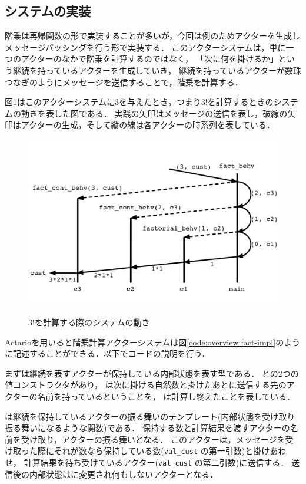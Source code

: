\subsection{システムの実装}

階乗は再帰関数の形で実装することが多いが，今回は例のためアクターを生成しメッセージパッシングを行う形で実装する．
このアクターシステムは，単に一つのアクターのなかで階乗を計算するのではなく，
「次に何を掛けるか」という継続を持っているアクターを生成していき，
継続を持っているアクターが数珠つなぎのようにメッセージを送信することで，階乗を計算する．

図\ref{img:overview:fact}はこのアクターシステムに$3$を与えたとき，つまり$3!$を計算するときのシステムの動きを表した図である．
実践の矢印はメッセージの送信を表し，破線の矢印はアクターの生成，そして縦の線は各アクターの時系列を表している．

\begin{figure}[tp]
  \centering
  \includegraphics[width=15cm]{./img/overview/fact.pdf}
  \label{img:overview:fact}
  \caption{$3!$を計算する際のシステムの動き}
\end{figure}

Actarioを用いると階乗計算アクターシステムは図\ref{code:overview:fact-impl}のように記述することができる．以下でコードの説明を行う．

まずは継続を表すアクターが保持している内部状態を表す型である．
との2つの値コンストラクタがあり，
は次に掛ける自然数と掛けたあとに送信する先のアクターの名前を持っているということを，
は計算し終えたことを表している．

は継続を保持しているアクターの振る舞いのテンプレート(内部状態を受け取り振る舞いになるような関数)である．
保持する数と計算結果を渡すアクターの名前を受け取り，アクターの振る舞いとなる．
このアクターは，メッセージを受け取った際にそれが数なら保持している数(\lstinline{val_cust} の第一引数)と掛けあわせ，
計算結果を待ち受けているアクター(\lstinline{val_cust} の第二引数)に送信する．
送信後の内部状態はに変更され何もしないアクターとなる．

